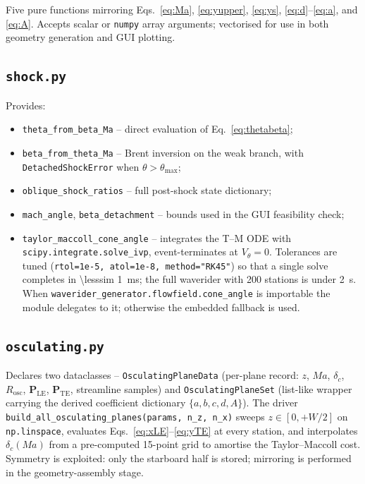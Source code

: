 \documentclass[11pt,a4paper]{article}
\newcommand{\Ma}{\mathit{Ma}}
\newcommand{\dc}{\delta_{c}}
\begin{document}
Five pure functions mirroring Eqs.~\ref{eq:Ma}, \ref{eq:yupper},
\ref{eq:ys}, \ref{eq:d}--\ref{eq:a}, and \ref{eq:A}. Accepts scalar or
\texttt{numpy} array arguments; vectorised for use in both geometry
generation and GUI plotting.

\subsection{\texttt{shock.py}}

Provides:
\begin{itemize}\setlength\itemsep{0pt}
\item \texttt{theta\_from\_beta\_Ma} -- direct evaluation of
      Eq.~\eqref{eq:thetabeta};
\item \texttt{beta\_from\_theta\_Ma} -- Brent inversion on the weak
      branch, with \texttt{DetachedShockError} when $\theta>\theta_{\max}$;
\item \texttt{oblique\_shock\_ratios} -- full post-shock state dictionary;
\item \texttt{mach\_angle}, \texttt{beta\_detachment} -- bounds used in
      the GUI feasibility check;
\item \texttt{taylor\_maccoll\_cone\_angle} -- integrates the T--M ODE
      with \texttt{scipy.integrate.solve\_ivp}, event-terminates at
      $V_{\theta}=0$. Tolerances are tuned
      (\texttt{rtol=1e-5, atol=1e-8, method="RK45"}) so that a single
      solve completes in \SI{\lesssim 1}{ms}; the full waverider with
      200 stations is under \SI{2}{s}. When
      \texttt{waverider\_generator.flowfield.cone\_angle} is importable
      the module delegates to it; otherwise the embedded fallback is
      used.
\end{itemize}

\subsection{\texttt{osculating.py}}

Declares two dataclasses -- \texttt{OsculatingPlaneData} (per-plane
record: $z$, $\Ma$, $\dc$, $R_{\mathrm{osc}}$, $\mathbf{P}_{\mathrm{LE}}$,
$\mathbf{P}_{\mathrm{TE}}$, streamline samples) and
\texttt{OsculatingPlaneSet} (list-like wrapper carrying the derived
coefficient dictionary $\{a,b,c,d,A\}$). The driver
\texttt{build\_all\_osculating\_planes(params, n\_z, n\_x)} sweeps
$z\in[0,+W/2]$ on \texttt{np.linspace}, evaluates
Eqs.~\eqref{eq:xLE}--\eqref{eq:yTE} at every station, and interpolates
$\dc(\Ma)$ from a pre-computed 15-point grid to amortise the
Taylor--Maccoll cost. Symmetry is exploited: only the starboard half is
stored; mirroring is performed in the geometry-assembly stage.
\end{document}
